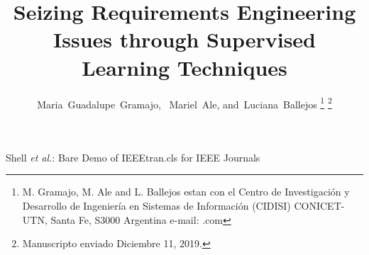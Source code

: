 \documentclass[journal]{IEEEtran}
\begin{document}
%
\title{Seizing Requirements Engineering Issues through Supervised Learning Techniques }
%
%
%

\author{Maria~Guadalupe~Gramajo,~
    Mariel~Ale,
        and~Luciana~Ballejos%
\thanks{M. Gramajo, M. Ale and L. Ballejos estan con el Centro de Investigación y Desarrollo de Ingeniería en Sistemas de Información (CIDISI) CONICET-UTN, Santa Fe, S3000 Argentina   e-mail: \gramajoguadalupe@gmail.com }
\thanks{Manuscripto enviado Diciembre 11, 2019.}}

% 
%



%
{Shell \MakeLowercase{\textit{et al.}}: Bare Demo of IEEEtran.cls for IEEE Journals}
% 
\end{document}
